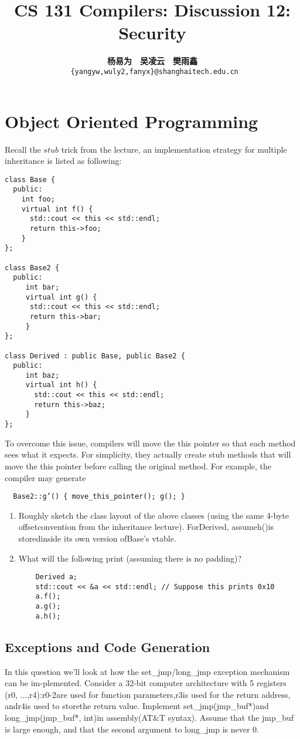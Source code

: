\documentclass[a4paper]{article}
\title{CS 131 Compilers: Discussion 12: Security}
\author{\textbf{杨易为}~~\textbf{吴凌云}~~\textbf{樊雨鑫} \\ \texttt{ \{yangyw,wuly2,fanyx\}@shanghaitech.edu.cn}}
\theoremstyle{definition}
\begin{document}
\maketitle
\section{Object Oriented Programming}
Recall the $stub$ trick from the lecture, an implementation strategy for multiple inheritance is listed as following:

\begin{verbatim}
class Base {
  public:
    int foo;
    virtual int f() {
      std::cout << this << std::endl; 
      return this->foo;
    }
};

class Base2 {
  public:
     int bar;
     virtual int g() {
      std::cout << this << std::endl; 
      return this->bar;
     }
};

class Derived : public Base, public Base2 {
  public:
     int baz;
     virtual int h() {
       std::cout << this << std::endl; 
       return this->baz;
     }
};
\end{verbatim}

To overcome this issue, compilers will move the this pointer so that each method sees what it expects. For simplicity, they actually create stub methods that will move the this pointer before calling the original method. For example, the compiler may generate

\begin{verbatim}
  Base2::g’() { move_this_pointer(); g(); }
\end{verbatim}

\begin{enumerate}
  \item Roughly sketch the class layout of the above classes (using the same 4-byte offsetconvention  from  the  inheritance  lecture).   ForDerived,  assumeh()is  storedinside its own version ofBase’s vtable.
  \item What will the following print (assuming there is no padding)?
  \begin{verbatim}
    Derived a;
    std::cout << &a << std::endl; // Suppose this prints 0x10
    a.f();
    a.g();
    a.h();
  \end{verbatim}
\end{enumerate}

\subsection{Exceptions and Code Generation}
In  this  question  we’ll  look  at  how  the  set\_jmp/long\_jmp  exception  mechanism  can  be  im-plemented.   Consider  a  32-bit  computer  architecture  with  5  registers  (r0,  ...,r4):r0-2are used for function parameters,r3is used for the return address, andr4is used to storethe return value.  Implement set\_jmp(jmp\_buf*)and long\_jmp(jmp\_buf*, int)in assembly(AT\&T syntax).  Assume that the jmp\_buf is large enough, and that the second argument to long\_jmp is never 0.
\end{document}
